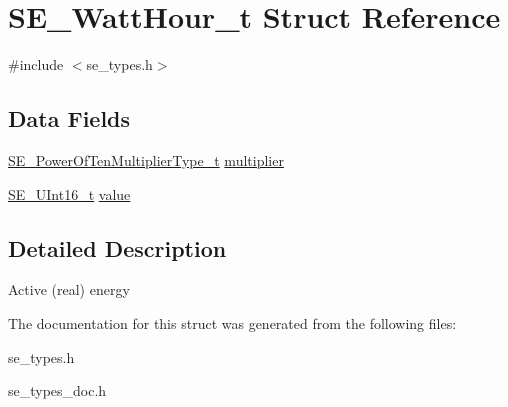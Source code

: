 \hypertarget{structSE__WattHour__t}{}\section{S\+E\+\_\+\+Watt\+Hour\+\_\+t Struct Reference}
\label{structSE__WattHour__t}


{\ttfamily \#include $<$se\+\_\+types.\+h$>$}

\subsection*{Data Fields}
\begin{DoxyCompactItemize}
\item 
\hyperlink{group__PowerOfTenMultiplierType_gaf0317b781dc8dbb9cb6ac4e44a14fdef}{S\+E\+\_\+\+Power\+Of\+Ten\+Multiplier\+Type\+\_\+t} \hyperlink{group__WattHour_gaedaddf97e4c507ae1b711f37393869cc}{multiplier}
\item 
\hyperlink{group__UInt16_gac68d541f189538bfd30cfaa712d20d29}{S\+E\+\_\+\+U\+Int16\+\_\+t} \hyperlink{group__WattHour_gac2cce5b2817c07af0f2b8a8de573d845}{value}
\end{DoxyCompactItemize}


\subsection{Detailed Description}
Active (real) energy 

The documentation for this struct was generated from the following files\+:\begin{DoxyCompactItemize}
\item 
se\+\_\+types.\+h\item 
se\+\_\+types\+\_\+doc.\+h\end{DoxyCompactItemize}
